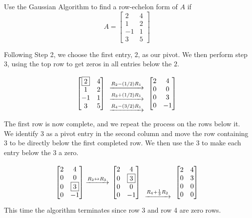 \documentclass{ximera}
\begin{document}
\begin{example}\label{ex:non-augmented}

Use the Gaussian Algorithm to find a row-echelon form of $A$ if $$A=\begin{bmatrix}2&4\\1&2\\-1&1\\3&5\end{bmatrix}$$ 
\begin{explanation}
Following Step 2, we choose the first entry, $2$, as our pivot.  We then perform step 3, using the top row to get zeros in all entries below the $2$.
$$\begin{bmatrix} \fbox{$2$}&4\\1&2\\-1&1\\3&5\end{bmatrix}
  \begin{array}{c}
  \\
  \xrightarrow{R_2-(1/2)R_1}\\
  \xrightarrow{R_3+(1/2)R_1}\\
 \xrightarrow{R_4-(3/2)R_1}\\
 \end{array}
\begin{bmatrix}2&4\\0&0\\0&3\\0&-1\end{bmatrix}
$$
The first row is now complete, and we repeat the process on the rows below it. We identify $3$ as a pivot entry in the second column and move the row containing $3$ to be directly below the first completed row.  We then use the $3$ to make each entry below the $3$ a zero.  

$$\begin{bmatrix}2&4\\0&0\\0&\fbox{$3$}\\0&-1\end{bmatrix}
\xrightarrow{R_2\leftrightarrow R_3}\\
\begin{bmatrix}2&4\\0&\fbox{$3$}\\0&0\\0&-1\end{bmatrix}
  \begin{array}{c}
 \\
\\
  \\
 \xrightarrow{R_4+\frac{1}{3}R_2}\\
 \end{array}
 \begin{bmatrix}2&4\\0&3\\0&0\\0&0\end{bmatrix}
$$
This time the algorithm terminates since row 3 and row 4 are zero rows. 
\end{explanation}
\end{example}
 
\end{document}
